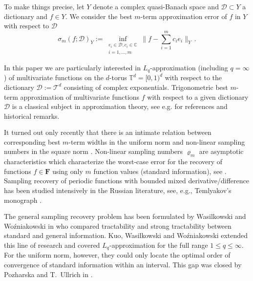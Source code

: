 \documentclass[11pt,reqno]{article}
\numberwithin{equation}{section}
\theoremstyle{definition}
\theoremstyle{plain}
\begin{document}
To make things precise, let $Y$ denote a complex quasi-Banach space and $\mathcal{D} \subset Y$ a dictionary and $f \in Y$. We consider the best $m$-term approximation error of $f$ in $Y$ with respect to $\mathcal{D}$ 
\begin{equation}\label{f001}
    \sigma_m(f;\mathcal{D})_Y := \inf\limits_{\substack{e_i \in \mathcal{D}, c_i \in \mathbb{C}\\i=1,...,m}} \Big\|f-\sum\limits_{i=1}^m c_i e_i\Big\|_Y\,.
\end{equation}

In this paper we are particularly interested in $L_q$-approximation (including $q=\infty$) of multivariate functions on the $d$-torus $\mathbb{T}^d=[0,1)^d$ with respect to the dictionary $\mathcal{D}:=\mathcal{T}^d$ consisting of complex exponentials. Trigonometric best $m$-term approximation of multivariate functions $f$ with respect to a given dictionary $\mathcal{D}$ is a  classical subject in approximation theory, see e.g. \cite[Chapt.\ 7] {DuTeUl18} for references and historical remarks. 

It turned out only recently that there is an intimate relation between corresponding best $m$-term widths in the uniform norm and non-linear sampling numbers in the square norm \cite{JUV23}. Non-linear sampling numbers $\varrho_m$ are asymptotic characteristics which characterize the worst-case error for the recovery of functions $f \in \mathbf{F}$ using only $m$ function values (standard information), see \cite[Sect.\ 4.1.1 and~4.1.4]{NovakWo2008}. Sampling recovery of periodic functions with bounded mixed derivative/difference has been studied intensively in the Russian literature, see, e.g., Temlyakov's monograph \cite[Chapt.\ 4]{Tem93_book}.  

The  general sampling recovery problem has been formulated by Wasilkowski and Wo\'{z}niakowski in \cite{WaWo01} who compared tractability and strong tractability between standard and general information. Kuo, Wasilkowski and Wo\'{z}niakowski \cite{KWW09} extended this line of research and covered $L_q$-approximation for the full range $1\leq q\leq \infty$. For the uniform norm, however, they could only locate the optimal order of convergence of standard information within an interval. This gap was closed by Pozharska and T.\ Ullrich in \cite{PoUl22}.
\end{document}
